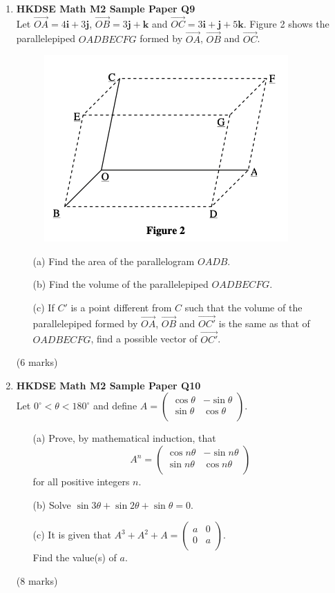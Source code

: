 \documentclass{report}
\begin{document}
\begin{enumerate}
	\item \textbf{HKDSE Math M2 Sample Paper Q9}\\
	Let $\overrightarrow{OA} = 4\textbf{i} +3 \textbf{j}$, $\overrightarrow{OB} = 3 \textbf{j} +\textbf {k}$ and $\overrightarrow{OC} = 3\textbf{i} + \textbf{j} +5\textbf {k}$. Figure 2 shows the parallelepiped $OADBECFG$ formed by $\overrightarrow{OA}$, $\overrightarrow{OB}$ and $\overrightarrow{OC}$. 
	\begin{figure}[H]
		\centering
		\includegraphics[width = .5\linewidth]{SPFigure2}
	\end{figure}
	\begin{enumerate}
		\item [(a)]Find the area of the parallelogram $OADB$.  
		\item [(b)]Find the volume of the parallelepiped $OADBECFG$.
		\item [(c)]If $C'$ is a point different from $C$ such that the volume of the parallelepiped formed by $\overrightarrow{OA}$, $\overrightarrow{OB}$ and $\overrightarrow{OC'}$ is the same as that of $OADBECFG$, find a possible vector of $\overrightarrow{OC'}$.
	\end{enumerate}
	(6 marks)

	\item \textbf{HKDSE Math M2 Sample Paper Q10}\\
	Let $0^{\circ} < \theta < 180^{\circ}$ and define $A = \begin{pmatrix}\cos{\theta}&-\sin{\theta}\\\sin{\theta}&\cos{\theta}\\\end{pmatrix}$.
	\begin{enumerate}
		\item [(a)]Prove, by mathematical induction, that
		$$A^n = \begin{pmatrix}\cos{n\theta}&-\sin{n\theta}\\\sin{n\theta}&\cos{n\theta}\\\end{pmatrix}$$ for all positive integers $n$.
		\item [(b)]Solve $\sin{3\theta} + \sin{2\theta} + \sin{\theta} = 0$.
		\item [(c)]It is given that $A^3 + A^2 + A = \begin{pmatrix}a&0\\0&a\\\end{pmatrix}$.\\Find the value(s) of $a$.
	\end{enumerate}
	(8 marks)
	

\end{enumerate}
\end{document}
